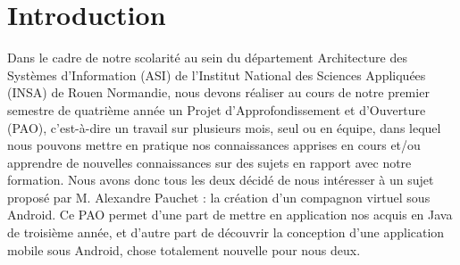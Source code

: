 \section*{Introduction}


Dans le cadre de notre scolarité au sein du département Architecture des Systèmes d’Information (ASI) de l’Institut National des Sciences Appliquées (INSA) de Rouen Normandie, nous devons réaliser au cours de notre premier semestre de quatrième année un Projet d’Approfondissement et d’Ouverture (PAO), c’est-à-dire un travail sur plusieurs mois, seul ou en équipe, dans lequel nous pouvons mettre en pratique nos connaissances apprises en cours et/ou apprendre de nouvelles connaissances sur des sujets en rapport avec notre formation.
Nous avons donc tous les deux décidé de nous intéresser à un sujet proposé par M. Alexandre Pauchet : la création d’un compagnon virtuel sous Android. Ce PAO permet d’une part de mettre en application nos acquis en Java de troisième année, et d’autre part de découvrir la conception d’une application mobile sous Android, chose totalement nouvelle pour nous deux.
